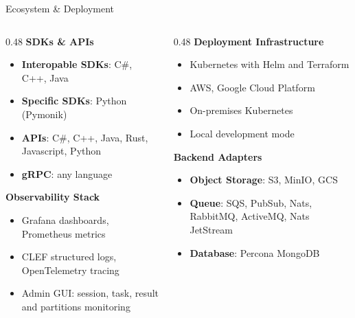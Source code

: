 \begin{frame}{Ecosystem \& Deployment}
	\begin{columns}[T]
		\begin{column}{0.48\textwidth}
			{\small\bfseries\color{aneoblue}SDKs \& APIs}\\[4pt]
			\begin{itemize}
				\item \textbf{Interopable SDKs}: C\#, C++, Java
				\item \textbf{Specific SDKs}: Python (Pymonik)
				\item \textbf{APIs}: C\#, C++, Java, Rust, Javascript, Python
				\item \textbf{gRPC}: any language
			\end{itemize}
			\vspace{0.3cm}
			{\small\bfseries\color{aneoblue}Observability Stack}\\[4pt]
			\begin{itemize}
				\item Grafana dashboards, Prometheus metrics
				\item CLEF structured logs, OpenTelemetry tracing
				\item Admin GUI: session, task, result and partitions monitoring
			\end{itemize}
		\end{column}
		\begin{column}{0.48\textwidth}
			{\small\bfseries\color{aneoblue}Deployment Infrastructure}\\[4pt]
			\begin{itemize}
				\item Kubernetes with Helm and Terraform
				\item AWS, Google Cloud Platform
				\item On-premises Kubernetes
				\item Local development mode
			\end{itemize}
			\vspace{0.3cm}
			{\small\bfseries\color{aneoblue}Backend Adapters}\\[4pt]
			\begin{itemize}
				\item \textbf{Object Storage}: S3, MinIO, GCS
				\item \textbf{Queue}: SQS, PubSub, Nats, RabbitMQ, ActiveMQ, Nats JetStream
				\item \textbf{Database}: Percona MongoDB
			\end{itemize}
		\end{column}
	\end{columns}
\end{frame}

